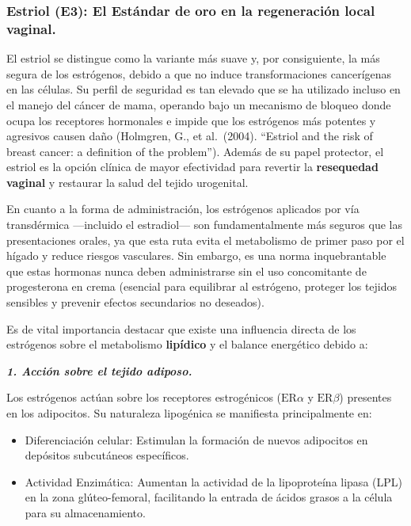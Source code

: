 \documentclass[
  spanish,
]{article}
\begin{document}
\subsubsection{Estriol (E3): El Estándar de oro en la regeneración local vaginal.}\label{estriol-e3-el-estuxe1ndar-de-oro-en-la-regeneraciuxf3n-local-vaginal.}

El estriol se distingue como la variante más suave y, por consiguiente, la más segura de los estrógenos, debido a que no induce transformaciones cancerígenas en las células. Su perfil de seguridad es tan elevado que se ha utilizado incluso en el manejo del cáncer de mama, operando bajo un mecanismo de bloqueo donde ocupa los receptores hormonales e impide que los estrógenos más potentes y agresivos causen daño (Holmgren, G., et al.~(2004). ``Estriol and the risk of breast cancer: a definition of the problem'').
Además de su papel protector, el estriol es la opción clínica de mayor efectividad para revertir la \textbf{resequedad vaginal} y restaurar la salud del tejido urogenital.

En cuanto a la forma de administración, los estrógenos aplicados por vía transdérmica ---incluido el estradiol--- son fundamentalmente más seguros que las presentaciones orales, ya que esta ruta evita el metabolismo de primer paso por el hígado y reduce riesgos vasculares.
Sin embargo, es una norma inquebrantable que estas hormonas nunca deben administrarse sin el uso concomitante de progesterona en crema (esencial para equilibrar al estrógeno, proteger los tejidos sensibles y prevenir efectos secundarios no deseados).

Es de vital importancia destacar que existe una influencia directa de los estrógenos sobre el metabolismo \textbf{lipídico} y el balance energético debido a:

\textbf{\emph{1. Acción sobre el tejido adiposo.}}

Los estrógenos actúan sobre los receptores estrogénicos (\(\text{ER}\alpha\) y \(\text{ER}\beta\)) presentes en los adipocitos. Su naturaleza lipogénica se manifiesta principalmente en:

\begin{itemize}
\item
  Diferenciación celular: Estimulan la formación de nuevos adipocitos en depósitos subcutáneos específicos.
\item
  Actividad Enzimática: Aumentan la actividad de la lipoproteína lipasa (LPL) en la zona glúteo-femoral, facilitando la entrada de ácidos grasos a la célula para su almacenamiento.
\end{itemize}
\end{document}
